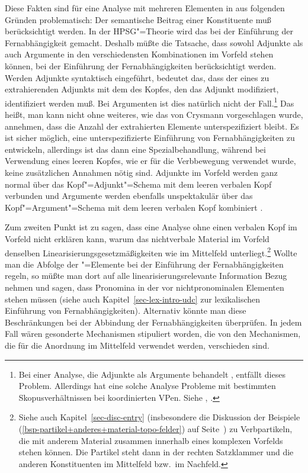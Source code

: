 Diese Fakten sind für eine Analyse mit mehreren Elementen in \slasch aus folgenden Gründen problematisch:
Der semantische Beitrag einer Konstituente muß berücksichtigt werden. In der HPSG"=Theorie
wird das bei der Einführung der Fernabhängigkeit gemacht. Deshalb müßte die Tatsache, dass
sowohl Adjunkte als auch Argumente in den verschiedensten Kombinationen im Vorfeld stehen
können, bei der Einführung der Fernabhängigkeiten berücksichtigt werden. Werden Adjunkte
syntaktisch eingeführt, bedeutet das, dass der \modw eines zu extrahierenden Adjunkts mit dem
\synsemw des Kopfes, den das Adjunkt modifiziert, identifiziert werden muß. Bei Argumenten
ist dies natürlich nicht der Fall.\footnote{
  Bei einer Analyse, die Adjunkte als Argumente behandelt \citep*{BMS2001a}, entfällt dieses Problem. Allerdings hat
  eine solche Analyse Probleme mit bestimmten Skopusverhältnissen bei koordinierten VPen.
  Siehe , .%
}
Das heißt, man kann nicht ohne weiteres, wie das von
Crysmann vorgeschlagen wurde, annehmen, dass die Anzahl der extrahierten Elemente unterspezifiziert
bleibt. Es ist sicher möglich, eine unterspezifizierte Einführung von Fernabhängigkeiten
zu entwickeln, allerdings ist das dann eine Spezialbehandlung, während bei Verwendung
eines leeren Kopfes, wie er für die Verbbewegung verwendet wurde, keine zusätzlichen Annahmen
nötig sind. Adjunkte im Vorfeld werden ganz normal über das Kopf"=Adjunkt"=Schema mit dem leeren
verbalen Kopf verbunden und Argumente werden ebenfalls unspektakulär über das Kopf"=Argument"=Schema
mit dem leeren verbalen Kopf kombiniert \citep[Abschnitt~4]{Mueller2005d}.

Zum zweiten Punkt ist zu sagen, dass eine Analyse ohne einen verbalen Kopf im Vorfeld nicht erklären
kann, warum das nichtverbale Material im Vorfeld denselben Linearisierungsgesetzmäßigkeiten 
wie im Mittelfeld unterliegt.\footnote{
  Siehe auch Kapitel~\ref{sec-disc-entry} (insbesondere die Diskussion der Beispiele (\ref{bsp-partikel+anderes+material-topo-felder})
  auf Seite~\pageref{bsp-partikel+anderes+material-topo-felder}) zu Verbpartikeln, die mit anderem Material zusammen
  innerhalb eines komplexen Vorfelds stehen können. Die Partikel steht dann in der rechten Satzklammer
  und die anderen Konstituenten im Mittelfeld bzw.\ im Nachfeld.%
} Wollte man die Abfolge der \slasch"=Elemente bei der Einführung der Fernabhängigkeiten
regeln, so müßte man dort auf alle linearisierungsrelevante Information Bezug nehmen und \zb
sagen, dass Pronomina in der \slashl vor nichtpronominalen Elementen stehen müssen (siehe auch Kapitel~\ref{sec-lex-intro-udc}
zur lexikalischen Einführung von Fernabhängigkeiten). Alternativ
könnte man diese Beschränkungen bei der Abbindung der Fernabhängigkeiten überprüfen. In jedem Fall
wären gesonderte Mechanismen stipuliert worden, die von den Mechanismen, die für die Anordnung
im Mittelfeld verwendet werden, verschieden sind.

